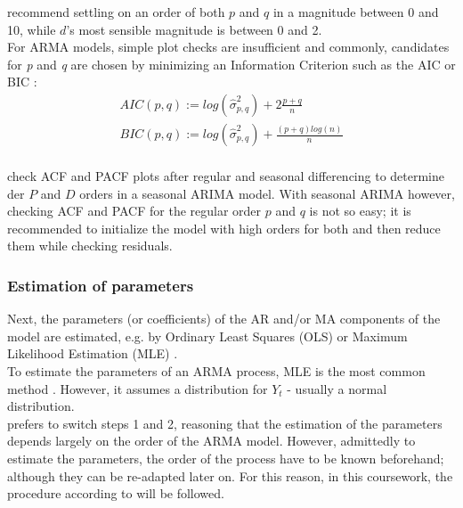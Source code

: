 \documentclass[a4paper, 11pt]{article}
\begin{document}
\cite{Zhou.2006} recommend settling on an order of both $p$ and $q$ in a magnitude between 0 and 10, while $d$'s most sensible magnitude is between 0 and 2.\\
For ARMA models, simple plot checks are insufficient and commonly, candidates for \textit{p} and \textit{q} are chosen by minimizing an Information Criterion such as 
the AIC or BIC \citep{Falk.2012}:
\begin{align}
	AIC(p,q) := log(\hat{\sigma}^{2}_{p,q}) + 2 \frac{p + q}{n}\\
	BIC(p,q) := log(\hat{\sigma}^{2}_{p,q}) +  \frac{(p + q)log(n)}{n}\\
\end{align}

\cite{Vogel.2015} check ACF and PACF plots after regular and seasonal differencing to determine der $P$ and $D$ orders in a seasonal ARIMA model. With seasonal ARIMA however, checking ACF and PACF for the regular order $p$ and $q$ is not so easy; it is recommended to initialize the model with high orders for both and then reduce them while checking residuals. 

\subsubsection{Estimation of parameters}
Next, the parameters (or coefficients) of the AR and/or MA components of the model are estimated, e.g. by Ordinary Least Squares (OLS) or Maximum Likelihood Estimation (MLE) \citep{Andreoni.2006b}.  \\
To estimate the parameters of an ARMA process, MLE is the most common method \citep{Vogel.2015}. However, it assumes a distribution for $Y_{t}$ - usually a normal distribution.
\\
\cite{Vogel.2015} prefers to switch steps 1 and 2, reasoning that the estimation of the parameters depends largely on the order of the ARMA model. However, admittedly to estimate the parameters, the order of the process have to be known beforehand; although they can be re-adapted later on.
For this reason, in this coursework, the procedure according to \cite{Box.1976} will be followed.\\
\\
\end{document}
